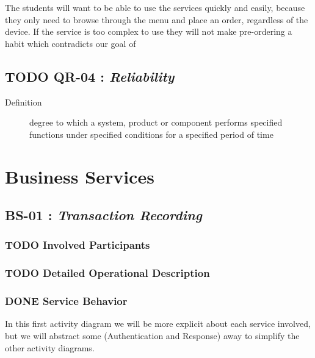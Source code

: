 \documentclass[11pt]{article}
\begin{document}
The students will want to be able to use the services quickly and
easily, because they only need to browse through the menu and place
an order, regardless of the device. If the service is too complex
to use they will not make pre-ordering a habit which contradicts
our goal of 
\newpage
\subsection{{\bfseries\sffamily TODO} \label{orgff76d7b}QR-04 : \emph{Reliability}}
\label{sec:org72e0c61}
\begin{description}
\item[{Definition}] degree to which a system, product or component
performs specified functions under specified
conditions for a specified period of time
\end{description}
\section{Business Services}
\label{sec:orgc3306c0}
\subsection{\label{org3795063}BS-01 : \emph{Transaction Recording}}
\label{sec:org4942511}
\subsubsection{{\bfseries\sffamily TODO} Involved Participants}
\label{sec:org553be4e}
\subsubsection{{\bfseries\sffamily TODO} Detailed Operational Description}
\label{sec:org4d2eaca}
\subsubsection{{\bfseries\sffamily DONE} Service Behavior}
\label{sec:org512d23e}
In this first activity diagram we will be more explicit about each
service involved, but we will abstract some (Authentication and
Response) away to simplify the other activity diagrams.
\end{document}
